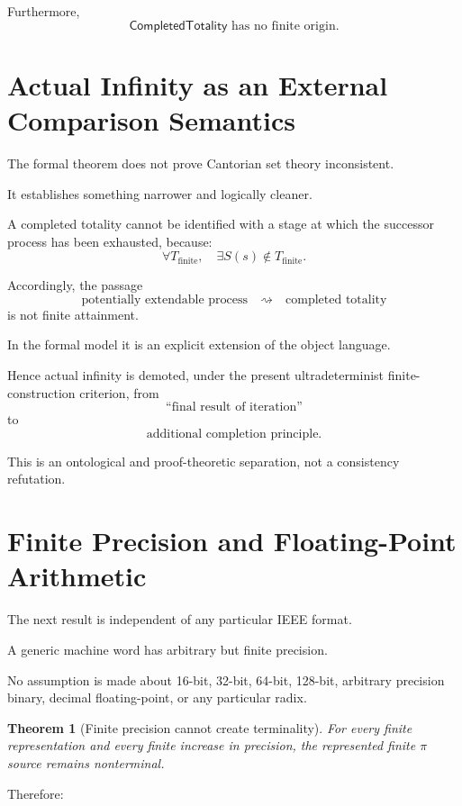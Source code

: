 \documentclass[11pt,a4paper]{article}
\newtheorem{theorem}{Theorem}
\newcommand{\CompletedTotality}{\mathsf{CompletedTotality}}
\begin{document}
Furthermore,
\[
\boxed{
\CompletedTotality
\text{ has no finite origin}.
}
\]

\section{Actual Infinity as an External Comparison Semantics}

The formal theorem does not prove Cantorian set theory inconsistent.

It establishes something narrower and logically cleaner.

A completed totality cannot be identified with a stage at which the
successor process has been exhausted, because:
\[
\forall T_{\mathrm{finite}},
\quad
\exists S(s)\notin T_{\mathrm{finite}}.
\]

Accordingly, the passage
\[
\text{potentially extendable process}
\quad\rightsquigarrow\quad
\text{completed totality}
\]
is not finite attainment.

In the formal model it is an explicit extension of the object language.

Hence actual infinity is demoted, under the present ultradeterminist finite-construction
criterion, from
\[
\text{``final result of iteration''}
\]
to
\[
\boxed{
\text{additional completion principle}.
}
\]

This is an ontological and proof-theoretic separation, not a
consistency refutation.

\section{Finite Precision and Floating-Point Arithmetic}

The next result is independent of any particular IEEE format.

A generic machine word has arbitrary but finite precision.

No assumption is made about 16-bit, 32-bit, 64-bit, 128-bit, arbitrary
precision binary, decimal floating-point, or any particular radix.

\begin{theorem}[Finite precision cannot create terminality]
For every finite representation and every finite increase in precision,
the represented finite $\pi$ source remains nonterminal.
\end{theorem}

Therefore:
\begin{center}
\end{center}
\end{document}
